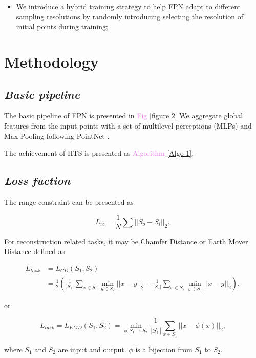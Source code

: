 \documentclass{article}
\begin{document}
\begin{multicols}{2}
\begin{itemize}
    \item We introduce a hybrid training strategy to help FPN 
    adapt to different sampling resolutions by randomly 
    introducing selecting the resolution of initial points 
    during training;\par
\end{itemize}

\section{Methodology}
\subsection{\textit{Basic pipeline}}
The basic pipeline of FPN is presented in \textcolor{violet}{Fig} \ref{figure 2} We aggregate global features from the input points with a set of multilevel perceptions (MLPs) and Max Pooling following PointNet \cite{PointNet2}.\par
The achievement of HTS is presented as \textcolor{violet}{Algorithm} \ref{Algo 1}.

\subsection{\textit{Loss fuction}}
The range constraint can be presented as

\begin{equation}
    L_{rc} = \frac{1}{N} \sum ||S_o - S_i||_2,
\end{equation}

For reconstruction related tasks, it may be Chamfer Distance or Earth Mover Distance \cite{KPConv} defined as

\begin{equation}
\begin{split}
    L_{task} & = L_{CD}(S_1,S_2) \\
             & = \frac{1}{2} (\frac{1}{|S_1|}\sum_{x \in S_1} \min_{y \in S_2} ||x-y||_2 + \frac{1}{|S_2|}\sum_{x \in S_2} \min_{y \in S_1} ||x-y||_2),
\end{split}
\end{equation}  

or

\begin{equation}
    L_{task} = L_{EMD}(S_1,S_2) = \min_{\phi:S_1\xrightarrow{}S_2}\frac{1}{|S_1|}\sum_{x \in S_1} ||x-\phi(x)||_2,
\end{equation}

where $S_1$ and $S_2$ are input and output. $\phi$ is a bijection from $S_1$ to $S_2$.


\end{multicols}
\end{document}
